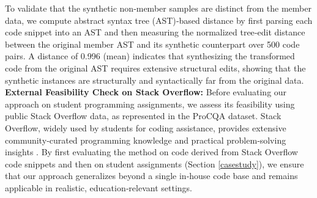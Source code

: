\documentclass[runningheads]{llncs}
\begin{document}

To validate that the synthetic non‑member samples are distinct from the member data, we compute abstract syntax tree (AST)‑based distance \cite{r71} by first parsing each code snippet into an AST and then measuring the normalized tree‑edit distance between the original member AST and its synthetic counterpart over 500 code pairs. A distance of 0.996 (mean) indicates that synthesizing the transformed code from the original AST requires extensive structural edits, showing that the synthetic instances are structurally and syntactically far from the original data.\\


\noindent \textbf{External Feasibility Check on Stack Overflow:} Before evaluating our approach on student programming assignments, we assess its feasibility using public Stack Overflow data, as represented in the ProCQA dataset. Stack Overflow, widely used by students for coding assistance, provides extensive community‑curated programming knowledge and practical problem‑solving insights \cite{r40}. By first evaluating the method on code derived from Stack Overflow code snippets and then on student assignments (Section \ref{casestudy}), we ensure that our approach generalizes beyond a single in‑house code base and remains applicable in realistic, education‑relevant settings.\\


\end{document}
